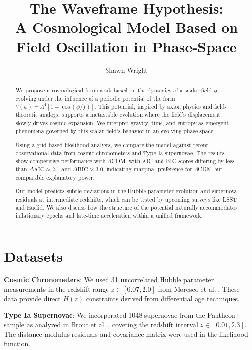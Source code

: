 \documentclass[12pt]{article}
\title{\textbf{The Waveframe Hypothesis:}\\ A Cosmological Model Based on Field Oscillation in Phase-Space}
\author[1]{Shawn Wright}
\affil[1]{Independent Researcher, Lexington, South Carolina \\ \texttt{shawnkardin@gmail.com}}
\date{}
\begin{document}
\maketitle



\begin{abstract}
We propose a cosmological framework based on the dynamics of a scalar field $\phi$ evolving under the influence of a periodic potential of the form \( V(\phi) = \Lambda^4 [1 - \cos(\phi/f)] \). This potential, inspired by axion physics and field-theoretic analogs, supports a metastable evolution where the field's displacement slowly drives cosmic expansion. We interpret gravity, time, and entropy as emergent phenomena governed by this scalar field’s behavior in an evolving phase space.

Using a grid-based likelihood analysis, we compare the model against recent observational data from cosmic chronometers and Type Ia supernovae. The results show competitive performance with $\Lambda$CDM, with AIC and BIC scores differing by less than $\Delta \mathrm{AIC} \approx 2.1$ and $\Delta \mathrm{BIC} \approx 3.0$, indicating marginal preference for $\Lambda$CDM but comparable explanatory power.

Our model predicts subtle deviations in the Hubble parameter evolution and supernova residuals at intermediate redshifts, which can be tested by upcoming surveys like LSST and Euclid. We also discuss how the structure of the potential naturally accommodates inflationary epochs and late-time acceleration within a unified framework.
\end{abstract}





\section{Datasets}

\textbf{Cosmic Chronometers}: We used 31 uncorrelated Hubble parameter measurements in the redshift range $z \in [0.07, 2.0]$ from Moresco et al. \cite{Moresco2016}. These data provide direct $H(z)$ constraints derived from differential age techniques.

\textbf{Type Ia Supernovae}: We incorporated 1048 supernovae from the Pantheon+ sample as analyzed in Brout et al. \cite{Brout2022}, covering the redshift interval $z \in [0.01, 2.3]$. The distance modulus residuals and covariance matrix were used in the likelihood function.
\end{document}
